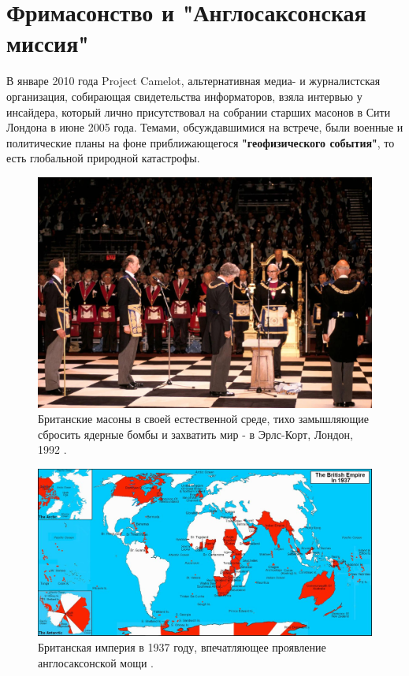 \documentclass[10pt,twocolumn,letterpaper]{article}
\begin{document}
\section{Фримасонство и "Англосаксонская миссия"}

В январе 2010 года Project Camelot, альтернативная медиа- и журналистская организация, собирающая свидетельства информаторов, взяла интервью \cite{4,6} у инсайдера, который лично присутствовал на собрании старших масонов в Сити Лондона в июне 2005 года. Темами, обсуждавшимися на встрече, были военные и политические планы на фоне приближающегося \textbf{"геофизического события"}, то есть глобальной природной катастрофы.

\begin{figure}[b]
\begin{center}
   \includegraphics[width=1\linewidth]{freemason.jpg}
\end{center}
   \caption{Британские масоны в своей естественной среде, тихо замышляющие сбросить ядерные бомбы и захватить мир - в Эрлс-Корт, Лондон, 1992 \cite{5}.}
\label{fig:1}
\label{fig:onecol}
\end{figure}

\begin{figure}[t]
\begin{center}
\includegraphics[width=1\textwidth]{british.jpg}
\end{center}
   \caption{Британская империя в 1937 году, впечатляющее проявление англосаксонской мощи \cite{14}.}
   \label{fig:2}
\end{figure}
\end{document}
